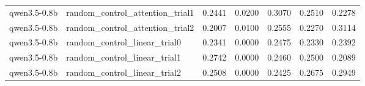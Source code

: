 \begin{tabular}{llrrrrr}
qwen3.5-0.8b & random_control_attention_trial1 & 0.2441 & 0.0200 & 0.3070 & 0.2510 & 0.2278 \\
qwen3.5-0.8b & random_control_attention_trial2 & 0.2007 & 0.0100 & 0.2555 & 0.2270 & 0.3114 \\
qwen3.5-0.8b & random_control_linear_trial0 & 0.2341 & 0.0000 & 0.2475 & 0.2330 & 0.2392 \\
qwen3.5-0.8b & random_control_linear_trial1 & 0.2742 & 0.0000 & 0.2460 & 0.2500 & 0.2089 \\
qwen3.5-0.8b & random_control_linear_trial2 & 0.2508 & 0.0000 & 0.2425 & 0.2675 & 0.2949 \\
\bottomrule
\end{tabular}
